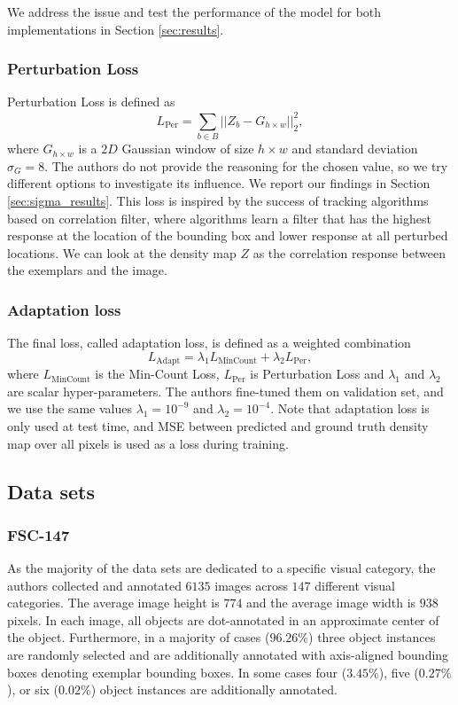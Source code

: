 We address the issue and test the performance of the model for both implementations in Section \ref{sec:results}.

\subsubsection{Perturbation Loss}
\label{sec:perturbation}

Perturbation Loss is defined as
\begin{equation}
L_{\text{Per}} = \sum_{b \in B}^{} ||Z_b - G_{h \times w} ||^{2}_{2},
\end{equation}
where $G_{h \times w}$ is a $2D$ Gaussian window of size $h \times w$ and standard deviation $\sigma_G = 8$. The authors do not provide the reasoning for the chosen value, so we try different options to investigate its influence. We report our findings in Section \ref{sec:sigma_results}. This loss is inspired by the success of tracking algorithms based on correlation filter, where algorithms learn a filter that has the highest response at the location of the bounding box and lower response at all perturbed locations. We can look at the density map $Z$ as the correlation response between the exemplars and the image.

\subsubsection{Adaptation loss}
\label{sec:adaptation}
The final loss, called adaptation loss, is defined as a weighted combination
\begin{equation}
L_{\text{Adapt}} = \lambda_1 L_{\text{MinCount}} + \lambda_2 L_{\text{Per}},
\end{equation}
where $L_{\text{MinCount}}$ is the Min-Count Loss, $L_{\text{Per}}$ is Perturbation Loss and $\lambda_1$ and $\lambda_2$ are scalar hyper-parameters. The authors fine-tuned them on validation set, and we use the same values $\lambda_1 = 10^{-9}$ and $\lambda_2 = 10^{-4}$. Note that adaptation loss is only used at test time, and MSE between predicted and ground truth density map over all pixels is used as a loss during training.

\subsection{Data sets}

\subsubsection{FSC-147}
As the majority of the data sets are dedicated to a specific visual category, the authors collected and annotated $6135$ images across $147$ different visual categories. The average image height is $774$ and the average image width is $938$ pixels. In each image, all objects are dot-annotated in an approximate center of the object. Furthermore, in a majority of cases ($96.26 \%$) three object instances are randomly selected and are additionally annotated with axis-aligned bounding boxes denoting exemplar bounding boxes. In some cases four ($3.45 \%$), five ($0.27 \%$), or six ($0.02 \%$) object instances are additionally annotated.

